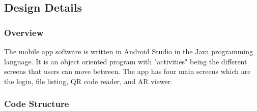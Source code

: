     \subsection{Design Details}

        \subsubsection{Overview}
The mobile app software is written in Android Studio in the Java programming language. It is an object oriented program with "activities" being the different screens that users can move between. The app has four main screens which are the login, file listing, QR code reader, and AR viewer.
        \subsubsection{Code Structure}


    